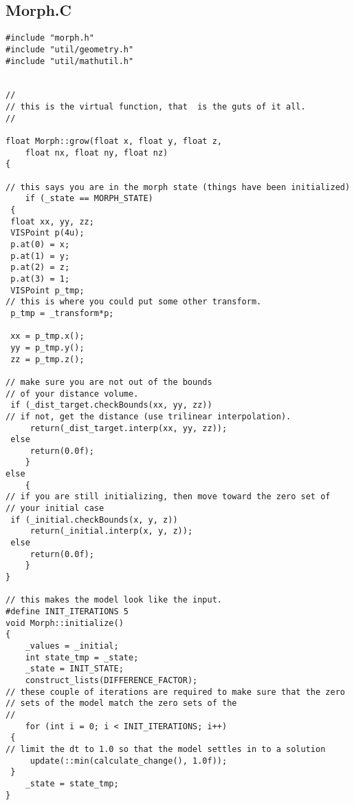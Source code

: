 \subsection{Morph.C}
\begin{tt}
\begin{verbatim}
#include "morph.h"
#include "util/geometry.h"
#include "util/mathutil.h"


//
// this is the virtual function, that  is the guts of it all.
//

float Morph::grow(float x, float y, float z,
    float nx, float ny, float nz)
{

// this says you are in the morph state (things have been initialized)
    if (_state == MORPH_STATE)
 {
 float xx, yy, zz;
 VISPoint p(4u);
 p.at(0) = x;
 p.at(1) = y;
 p.at(2) = z;
 p.at(3) = 1;
 VISPoint p_tmp;
// this is where you could put some other transform.
 p_tmp = _transform*p;

 xx = p_tmp.x();
 yy = p_tmp.y();
 zz = p_tmp.z();

// make sure you are not out of the bounds
// of your distance volume.
 if (_dist_target.checkBounds(xx, yy, zz))
// if not, get the distance (use trilinear interpolation).
     return(_dist_target.interp(xx, yy, zz));
 else
     return(0.0f);
    }
else
    {
// if you are still initializing, then move toward the zero set of
// your initial case
 if (_initial.checkBounds(x, y, z))
     return(_initial.interp(x, y, z));
 else
     return(0.0f);
    }
}

// this makes the model look like the input.
#define INIT_ITERATIONS 5
void Morph::initialize()
{
    _values = _initial;
    int state_tmp = _state;
    _state = INIT_STATE;
    construct_lists(DIFFERENCE_FACTOR);
// these couple of iterations are required to make sure that the zero
// sets of the model match the zero sets of the
//
    for (int i = 0; i < INIT_ITERATIONS; i++)
 {
// limit the dt to 1.0 so that the model settles in to a solution
     update(::min(calculate_change(), 1.0f));
 }
    _state = state_tmp;
}

\end{verbatim}
\end{tt}

